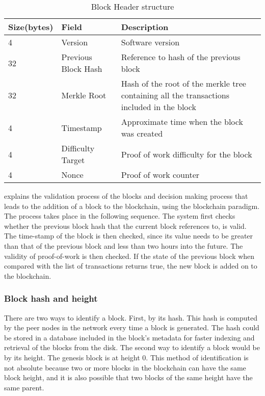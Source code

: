 \documentclass[english]{tktltiki}
\begin{document}
\begin{table}[H]
\centering
\begin{tabular}{|l|l|p{8.2cm}|}
\hline
\textbf{Size(bytes)} & \textbf{Field}      & \textbf{Description}                                                                      \\ \hline
4                     & Version             & Software version                                                                          \\ \hline
32                    & Previous Block Hash & Reference to hash of the previous block                                                   \\ \hline 
32                    & Merkle Root         & Hash of the root of the merkle tree 
containing all the transactions included in the block \\ \hline 

4                     & Timestamp           & Approximate time when the block was created                                               \\ \hline
4                     & Difficulty Target        & Proof of work difficulty for the block                                                    \\ \hline
4                     & Nonce               & Proof of work counter                                                                     \\ \hline
\end{tabular}
\caption{Block Header structure}
\label{block-header}
\end{table}

\cite{ethereum1} explains the validation process of the blocks and decision making process that leads to the addition of a block to the blockchain, using the blockchain paradigm. The process takes place in the following sequence. The system first checks whether the previous block hash that the current block references to, is valid. The time-stamp of the block is then checked, since its value needs to be greater than that of the previous block and less than two hours into the future. The validity of proof-of-work is then checked. If the state of the previous block when compared with the list of transactions returns true, the new block is added on to the blockchain.

\subsubsection*{Block hash and height}
There are two ways to identify a block. First, by its hash. This hash is computed by the peer nodes in the network every time a block is generated. The hash could be stored in a database included in the block's metadata for faster indexing and retrieval of the blocks from the disk. The second way to identify a block would be by its height. The genesis block is at height 0. This method of identification is not absolute because two or more blocks in the blockchain can have the same block height, and it is also possible that two blocks of the same height have the same parent.
\end{document}
